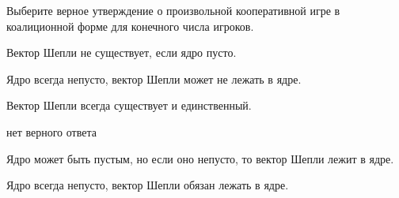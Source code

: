 
\begin{question}
Выберите верное утверждение о произвольной кооперативной игре в
коалиционной форме для конечного числа игроков.
\begin{answerlist}
  \item Вектор Шепли не существует, если ядро пусто.
  \item Ядро всегда непусто, вектор Шепли может не лежать в ядре.
  \item Вектор Шепли всегда существует и единственный.
  \item нет верного ответа
  \item Ядро может быть пустым, но если оно непусто, то вектор Шепли лежит в
ядре.
  \item Ядро всегда непусто, вектор Шепли обязан лежать в ядре.
\end{answerlist}
\end{question}


